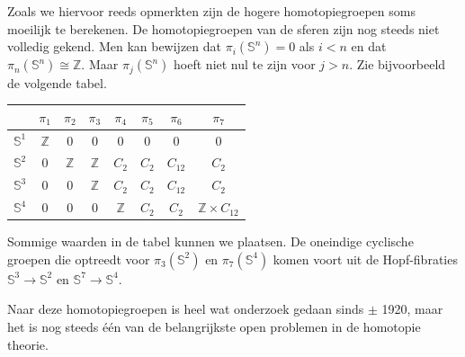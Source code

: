 \documentclass[12pt]{book}
\newcommand{\Z}{\mathbb{Z}}
\newcommand{\Sf}{\mathbb{S}}
\begin{document}
\bigskip
Zoals we hiervoor reeds opmerkten zijn de hogere homotopiegroepen soms moeilijk te berekenen. De
homotopiegroepen van de sferen zijn nog steeds niet volledig gekend. Men kan bewijzen dat
$\pi_{i}(\mathbb{S}^n)=0$ als $i<n$ en dat $\pi_{n}(\mathbb{S}^n)\cong \Z$. Maar
$\pi_{j}(\mathbb{S}^n)$ hoeft niet nul te zijn voor $j>n$. Zie bijvoorbeeld de volgende tabel.


\begin{center}
\begin{tabular}{l | c c c c c c c}
   & $\pi_1$ & $\pi_2$ & $\pi_3$ & $\pi_4$ & $\pi_5$ & $\pi_6$ & $\pi_7$\\
\hline
$\Sf^1$ & $\Z$ & 0 & 0 & 0 & 0 & 0 & 0 \\
$\Sf^2$ & 0 & $\Z$ & $\Z$ & $C_2$ & $C_2$ & $C_{12}$ & $C_2$ \\
$\Sf^3$ & 0 & 0 & $\Z$ & $C_2$ & $C_2$ & $C_{12}$ & $C_2$ \\
$\Sf^4$ & 0 & 0  & 0 & $\Z$ & $C_2$ & $C_{2}$ & $\Z \times C_{12}$ \\
\end{tabular}
\end{center}

Sommige waarden in de tabel kunnen we plaatsen. De oneindige cyclische groepen die optreedt voor $\pi_3 (\Sf^2)$ en $\pi_7 (\Sf^4)$ komen voort uit de Hopf-fibraties $\Sf^3 \to \Sf^2$ en $\Sf^7 \to \Sf^4$.





Naar deze homotopiegroepen is heel wat onderzoek
gedaan sinds $\pm$ 1920, maar het is nog steeds \'e\'en van de belangrijkste open problemen in de homotopie theorie. 
\end{document}
